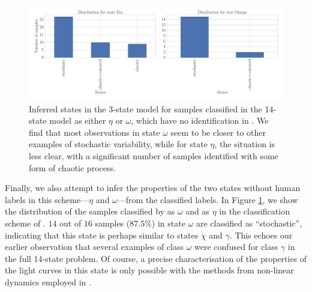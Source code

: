 \documentclass[12pt]{emulateapj}
\begin{document}
\begin{figure}[htbp]
\begin{center}
\includegraphics[width=\textwidth]{grs1915_supervised_eta_omega.pdf}
\caption{Inferred states in the 3-state model for samples classified in the 14-state model as either $\eta$ or $\omega$, which have no identification in \citet{harikrishnan2011}.
We find that most observations in state $\omega$ seem to be closer to other examples of stochastic variability, while for state $\eta$, the situation is less clear, with a significant 
number of samples identified with some form of chaotic process.} 
\label{fig:etaomega_states}
\end{center}
\end{figure}

Finally, we also  attempt to infer the properties of the two states without human labels in this scheme---$\eta$ and $\omega$---from the classified labels. 
In Figure \ref{fig:etaomega_states}, we show the distribution of the samples classified by \citet{kleinwolt2002} as $\omega$ and \citet{hannikainen2003} as $\eta$ 
in the classification scheme of \citet{harikrishnan2011}.
$14$ out of $16$ samples ($87.5\%$) in state $\omega$ are classified as ``stochastic'', indicating that this state is perhaps similar to states $\chi$ and $\gamma$. This echoes our earlier observation that several examples of class $\omega$ were confused for 
class $\gamma$ in the full 14-state problem. Of course, a precise characterisation of the properties of the light curves in this state is only possible with the 
methods from non-linear dynamics employed in \citet{harikrishnan2011}.
\end{document}

